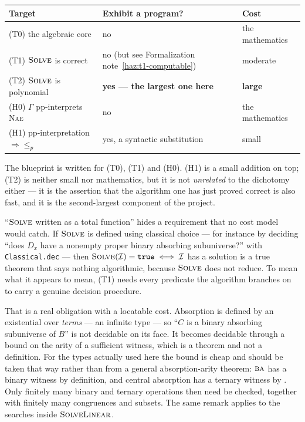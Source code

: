 \begin{center}
\begin{tabular}{@{}lll@{}}
\hline
Target & Exhibit a program? & Cost \\
\hline
\textup{(T0)} the algebraic core & no & the mathematics \\
\textup{(T1)} $\textsc{Solve}$ is correct & no (but see Formalization note~\ref{haz:t1-computable}) & moderate \\
\textup{(T2)} $\textsc{Solve}$ is polynomial & \textbf{yes --- the largest one here} & \textbf{large} \\
\textup{(H0)} $\Gamma$ pp-interprets \textsc{Nae} & no & the mathematics \\
\textup{(H1)} pp-interpretation $\Rightarrow\le_{p}$ & yes, a syntactic substitution & small \\
\hline
\end{tabular}
\end{center}

The blueprint is written for \textup{(T0)}, \textup{(T1)} and \textup{(H0)}.
\textup{(H1)} is a small addition on top; \textup{(T2)} is neither small nor
mathematics, but it is not \emph{unrelated} to the dichotomy either --- it is
the assertion that the algorithm one has just proved correct is also fast, and
it is the second-largest component of the project.

\begin{hazard}
\label{haz:t1-computable}
``$\textsc{Solve}$ written as a total function'' hides a requirement that no
cost model would catch. If $\textsc{Solve}$ is defined using classical choice
--- for instance by deciding ``does $D_{x}$ have a nonempty proper binary
absorbing subuniverse?'' with \texttt{Classical.dec} --- then
$\textsc{Solve}(\mathcal I)=\texttt{true}\iff\mathcal I$ has a solution is a
true theorem that says nothing algorithmic, because $\textsc{Solve}$ does not
reduce. To mean what it appears to mean, \textup{(T1)} needs every predicate
the algorithm branches on to carry a genuine decision procedure.

That is a real obligation with a locatable cost. Absorption is defined by an
existential over \emph{terms} --- an infinite type --- so ``$C$ is a binary
absorbing subuniverse of $B$'' is not decidable on its face. It becomes
decidable through a bound on the arity of a sufficient witness, which is a
theorem and not a definition. For the types actually used here the bound is
cheap and should be taken that way rather than from a general absorption-arity
theorem: $\textup{\textsc{ba}}$ has a binary witness by definition, and central absorption has
a ternary witness by . Only finitely many binary
and ternary operations then need be checked, together with finitely many
congruences and subsets. The same remark applies to the searches inside
$\textsc{SolveLinear}$.
\end{hazard}

